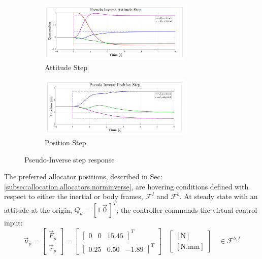 \begin{figure}[hbtp]
\vspace{-12pt}
\centering
\begin{subfigure}{\textwidth}
\centering
\includegraphics[width=0.8\textwidth]{graphs/pseudo_inverse_attitude}
\vspace{-12pt}
\caption{Attitude Step}
\label{fig:pseudo_inverse_attitude}
\end{subfigure}
\begin{subfigure}{\textwidth}
\vspace{-3pt}
\centering
\includegraphics[width=0.8\textwidth]{graphs/pseudo_inverse_position}
\vspace{-12pt}
\caption{Position Step}
\label{fig:pseudo_inverse_position}
\end{subfigure}
\vspace{-8pt}
\caption{Pseudo-Inverse step response}
\label{fig:pseudo-inverse-step}
\vspace{-24pt}
\end{figure}
\par
The preferred allocator positions, described in Sec:\ref{subsec:allocation.allocators.norminverse}, are hovering conditions defined with respect to either the inertial or body frames, $\mathcal{F}^{I}$ and $\mathcal{F}^{b}$. At steady state with an attitude at the origin, $Q_d=[1~\vec{0}\hspace{2pt}]^T$; the controller commands the virtual control input:
\begin{equation}\label{eq:hover-actuator}
\vec{\nu}_p=\begin{bmatrix}
\vec{F}_p\\
\vec{\tau}_p
\end{bmatrix}
=
\begin{bmatrix}
\begin{bmatrix}
0&0&15.45
\end{bmatrix}^T
\\
\begin{bmatrix}
0.25&
0.50&
-1.89
\end{bmatrix}^T
\end{bmatrix}~~~~\begin{bmatrix}
[\text{N}]\\
[\text{N.mm}]
\end{bmatrix}~~~~\in\mathcal{F}^{b,I}
\end{equation}
